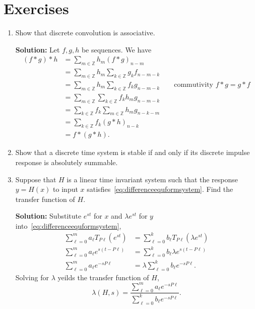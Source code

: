 \documentclass[11pt,a4paper]{book}
\theoremstyle{plain}
\numberwithin{equation}{section}
\newcommand{\ints}{{\mathbb Z}}
\newenvironment{solution}{\begin{footnotesize}\textbf{Solution:}}{\end{footnotesize}}
\newenvironment{excersizelist}{%
  \renewcommand*{\theenumi}{\thechapter.\arabic{enumi}}%
  \newcommand\itemadvanced{\stepcounter{enumi}\item[$\ast$\, \theenumi.]}
  \begin{enumerate}
}{%
  \end{enumerate}
}
\begin{document}

\section{Exercises}

\begin{excersizelist}


\item \label{excer:discrconvassociative} Show that discrete convolution is associative.
\begin{solution}
Let $f,g,h$ be sequences.  We have
\begin{align*}
(f*g)*h &= \sum_{m \in \ints} h_{m} (f*g)_{n-m} \\
&= \sum_{m \in \ints} h_{m} \sum_{k \in \ints} g_{k} f_{n-m-k} \\
&= \sum_{m \in \ints} h_{m} \sum_{k \in \ints} f_{k} g_{n-m-k} \qquad \text{commutivity $f*g=g*f$} \\
&= \sum_{m \in \ints} \sum_{k \in \ints} f_{k} h_m g_{n-m-k} \\
&= \sum_{k \in \ints} f_{k} \sum_{m \in \ints}  h_m g_{n-k-m} \\
&= \sum_{k \in \ints} f_{k} (g*h)_{n-k} \\
&= f*(g*h).
\end{align*}
\end{solution}

\item \label{excer:stableimpulserespdiscretetime} Show that a discrete time system is stable if and only if its discrete impulse response is absolutely summable. 

\item \label{exer:findtransfuncdiffeq} Suppose that $H$ is a linear time invariant system such that the response $y = H(x)$ to input $x$ satisfies~\eqref{eq:differenceequformsystem}.  Find the transfer function of $H$.
\begin{solution}
Substitute $e^{st}$ for $x$ and $\lambda e^{st}$ for $y$ into~\eqref{eq:differenceequformsystem},
\begin{align*}
\sum_{\ell=0}^{m} a_\ell T_{P\ell}(e^{st}) &= \sum_{\ell=0}^{k} b_\ell T_{P\ell}(\lambda e^{st}) \\
\sum_{\ell=0}^{m} a_\ell e^{s(t-P\ell)} &= \sum_{\ell=0}^{k} b_\ell \lambda e^{s(t-P\ell)} \\
\sum_{\ell=0}^{m} a_\ell e^{-sP\ell} &= \lambda \sum_{\ell=0}^{k} b_\ell e^{-sP\ell}.
\end{align*}
Solving for $\lambda$ yeilds the transfer function of $H$,
\[
\lambda(H,s) = \frac{\sum_{\ell=0}^{m} a_\ell e^{-sP\ell}}{\sum_{\ell=0}^{k} b_\ell e^{-sP\ell}}.
\]
\end{solution}


\end{excersizelist}
\end{document}
